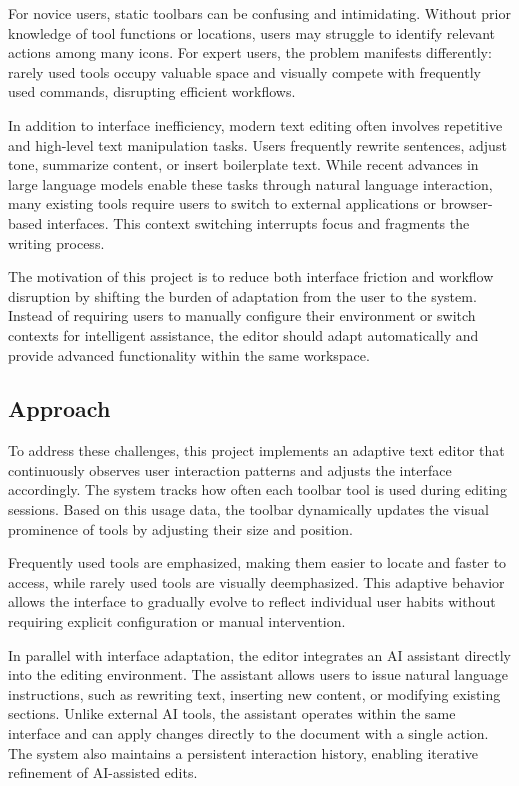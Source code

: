 \documentclass[sigconf]{acmart}
\begin{document}
For novice users, static toolbars can be confusing and intimidating. Without prior knowledge of tool functions or locations, users may struggle to identify relevant actions among many icons. For expert users, the problem manifests differently: rarely used tools occupy valuable space and visually compete with frequently used commands, disrupting efficient workflows.

In addition to interface inefficiency, modern text editing often involves repetitive and high-level text manipulation tasks. Users frequently rewrite sentences, adjust tone, summarize content, or insert boilerplate text. While recent advances in large language models enable these tasks through natural language interaction, many existing tools require users to switch to external applications or browser-based interfaces. This context switching interrupts focus and fragments the writing process.

The motivation of this project is to reduce both interface friction and workflow disruption by shifting the burden of adaptation from the user to the system. Instead of requiring users to manually configure their environment or switch contexts for intelligent assistance, the editor should adapt automatically and provide advanced functionality within the same workspace.

\subsection{Approach}

To address these challenges, this project implements an adaptive text editor that continuously observes user interaction patterns and adjusts the interface accordingly. The system tracks how often each toolbar tool is used during editing sessions. Based on this usage data, the toolbar dynamically updates the visual prominence of tools by adjusting their size and position.

Frequently used tools are emphasized, making them easier to locate and faster to access, while rarely used tools are visually deemphasized. This adaptive behavior allows the interface to gradually evolve to reflect individual user habits without requiring explicit configuration or manual intervention.

In parallel with interface adaptation, the editor integrates an AI assistant directly into the editing environment. The assistant allows users to issue natural language instructions, such as rewriting text, inserting new content, or modifying existing sections. Unlike external AI tools, the assistant operates within the same interface and can apply changes directly to the document with a single action. The system also maintains a persistent interaction history, enabling iterative refinement of AI-assisted edits.
\end{document}

